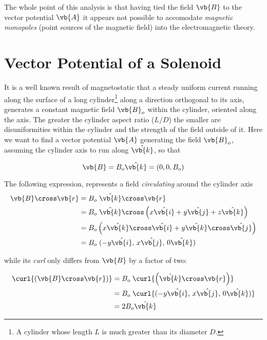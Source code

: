 The whole point of this analysis is that having tied the field $\vb{B}$ to the vector potential $\vb{A}$ it appears not possible to accomodate \textit{magnetic monopoles} (point sources of the magnetic field) into the electromagnetic theory. 

\section{Vector Potential of a Solenoid}

It is a well known result of magnetostatic that a steady uniform current running along the surface of a long cylinder\footnote{A cylinder whose length $L$ is much greater than its diameter $D$.} along a direction orthogonal to its axis, generates a constant magnetic field $\vb{B}_o$ within the cylinder, oriented along the axis. The greater the cylinder aspect ratio ($L/D$) the smaller are disuniformities within the cylinder and the strength of the field outside of it. Here we want to find a vector potential $\vb{A}$ generating the field $\vb{B}_o$, assuming the cylinder axis to run along $\hat{\vb{k}}$, so that 

\begin{equation*}
\vb{B}  = B_o \hat{\vb{k}} = (0, 0, B_o)
\end{equation*}

The following expression, represents a field \textit{circulating} around the cylinder axis
\begin{equation*}
\begin{aligned}
\vb{B} \cross \vb{r} &= B_o \; \hat{\vb{k}} \cross \vb{r} \\
					 &= B_o \; \hat{\vb{k}} \cross \left( x \hat{\vb{i}} + y \hat{\vb{j}} + z \hat{\vb{k}} \right) \\
                     &= B_o \left( x \hat{\vb{k}} \cross \hat{\vb{i}} + y \hat{\vb{k}} \cross \hat{\vb{j}} \right) \\
                     &= B_o \; (-y  \hat{\vb{i}},\, x \hat{\vb{j}},\, 0 \hat{\vb{k}})
\end{aligned}                     
\end{equation*}


while its \textit{curl} only differs from $\vb{B}$ by a factor of two:

\begin{equation*}
\begin{aligned}
\curl{\left( \vb{B} \cross \vb{r} \right) } &= B_o \; \curl{\left( \hat{\vb{k}} \cross \vb{r} \right)} \\
											&= B_o \; \curl{(-y  \hat{\vb{i}},\, x \hat{\vb{j}},\, 0 \hat{\vb{k}})} \\
                                            &= 2 B_o \hat{\vb{k}}
\end{aligned}                     
\end{equation*}

